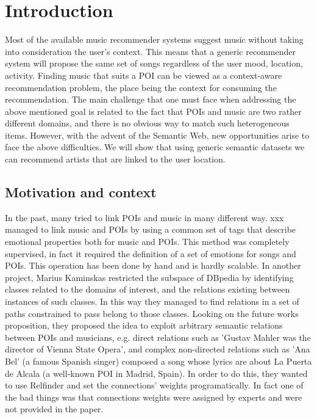 \documentclass[paper=a4, fontsize=11pt]{scrartcl}
\begin{document}
\tableofcontents
\newpage

\section{Introduction}
Most of the available music recommender systems suggest music without taking into consideration the user’s context. This means that a generic recommender system will propose the same set of songs regardless of the user mood, location, activity.
Finding music that suits a POI can be viewed as a context-aware recommendation problem, the place being the context for consuming the recommendation.         
The main challenge that one must face when addressing the above mentioned goal is related to the fact that POIs and music are two rather different domains, and there is no obvious way to match such heterogeneous items. However, with the advent of the Semantic Web, new opportunities arise to face the above difficulties. We will show that using generic semantic datasets we can recommend artists that are linked to the user location.

\subsection{Motivation and context}
In the past, many tried to link POIs and music in many different way. xxx managed to link music and POIs by using a common set of tags that describe emotional properties both for music and POIs.
This method was completely supervised, in fact it required the definition of a set of emotions for songs and POIs. This operation has been done by hand and is hardly scalable.
In another project, Marius Kaminskas restricted the subspace of DBpedia by identifying classes related to the domains of interest, and the relations existing between instances of such classes. In this way they managed to find relations in a set of paths constrained to pass belong to those classes. Looking on the future works proposition, they proposed the idea to exploit arbitrary semantic relations between POIs and musicians, e.g. direct relations such as 'Gustav Mahler was the director of Vienna State Opera', and complex non-directed relations such as 'Ana Bel' (a famous Spanish singer) composed a song whose lyrics are about La Puerta de Alcala (a well-known POI in Madrid, Spain). 
In order to do this, they wanted to use Relfinder and set the connections' weights programatically. In fact one of the bad things was that connections weights were assigned by experts and were not provided in the paper.
\end{document}

